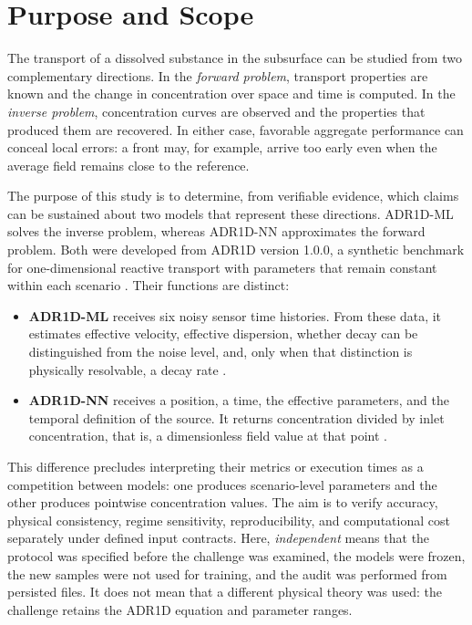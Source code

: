 \documentclass[11pt,a4paper]{article}
\begin{document}
\newpage
\tableofcontents
\clearpage

\section{Purpose and Scope}

The transport of a dissolved substance in the subsurface can be studied from
two complementary directions. In the \emph{forward problem}, transport
properties are known and the change in concentration over space and time is
computed. In the \emph{inverse problem}, concentration curves are observed and
the properties that produced them are recovered. In either case, favorable
aggregate performance can conceal local errors: a front may, for example,
arrive too early even when the average field remains close to the reference.

The purpose of this study is to determine, from verifiable evidence, which
claims can be sustained about two models that represent these directions.
ADR1D-ML solves the inverse problem, whereas ADR1D-NN approximates the forward
problem. Both were developed from ADR1D version 1.0.0, a synthetic benchmark
for one-dimensional reactive transport with parameters that remain constant
within each scenario \cite{adr1d}. Their functions are distinct:

\begin{itemize}
    \item \textbf{ADR1D-ML} receives six noisy sensor time histories. From
    these data, it estimates effective velocity, effective dispersion, whether
    decay can be distinguished from the noise level, and, only when that
    distinction is physically resolvable, a decay rate \cite{adr1dml}.
    \item \textbf{ADR1D-NN} receives a position, a time, the effective
    parameters, and the temporal definition of the source. It returns
    concentration divided by inlet concentration, that is, a dimensionless
    field value at that point \cite{adr1dnn}.
\end{itemize}

This difference precludes interpreting their metrics or execution times as a
competition between models: one produces scenario-level parameters and the
other produces pointwise concentration values. The aim is to verify accuracy,
physical consistency, regime sensitivity, reproducibility, and computational
cost separately under defined input contracts. Here, \emph{independent} means
that the protocol was specified before the challenge was examined, the models
were frozen, the new samples were not used for training, and the audit was
performed from persisted files. It does not mean that a different physical
theory was used: the challenge retains the ADR1D equation and parameter ranges.
\end{document}
